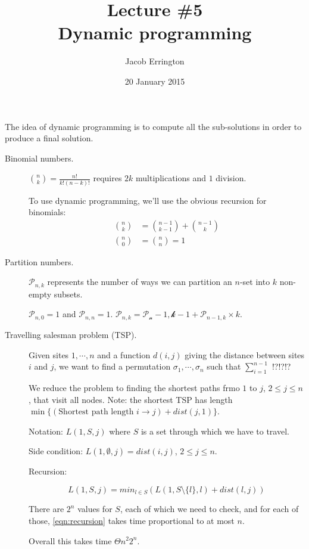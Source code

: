 \documentclass{article}
\author{Jacob Errington}
\title{Lecture \#5 \\ Dynamic programming}
\date{20 January 2015}
\begin{document}
The idea of dynamic programming is to compute all the sub-solutions in order to produce a final solution.

\begin{description}
    \item[Binomial numbers.] $\binom{n}{k} = \frac{n!}{k!(n-k)!}$ requires $2k$ multiplications and $1$ division.

        To use dynamic programming, we'll use the obvious recursion for binomials:
        \begin{align*}
            \binom{n}{k} &= \binom{n-1}{k-1} + \binom{n-1}{k} \\
            \binom{n}{0} &= \binom{n}{n} = 1
        \end{align*}

    \item[Partition numbers.] $\mathcal{P}_{n,k}$ represents the number of ways we can partition an $n$-set into $k$ non-empty subsets.

        $\mathcal{P}_{n,0} = 1$ and $\mathcal{P}_{n,n} = 1$. $\mathcal{P}_{n,k} = \mathcal{P_n-1,k-1} + \mathcal{P}_{n-1,k} \times k$.

    \item[Travelling salesman problem (TSP).]
        Given sites $1,\cdots,n$ and a function $d(i,j)$ giving the distance between sites $i$ and $j$, we want to find a permutation $\sigma_1, \cdots, \sigma_n$ such that $\sum_{i=1}^{n-1}$ !?!?!?

        We reduce the problem to finding the shortest paths frmo $1$ to $j$, $2 \leq j \leq n$, that visit all nodes. Note: the shortest TSP has length $\min\{(\text{Shortest path length } i\to j) + dist(j, 1)\}$.

        Notation: $L(1, S, j)$ where $S$ is a set through which we have to travel.

        Side condition: $L(1, \emptyset, j) = dist(i, j)$, $2 \leq j \leq n$.

        Recursion:

        \begin{equation}
            L(1, S, j) = min_{l\in S}(L(1, S\setminus \{l\}, l) + dist(l, j))
            \label{eqn:recursion}
        \end{equation}

        There are $2^n$ values for $S$, each of which we need to check, and for each of those, \eqref{eqn:recursion} takes time proportional to at most $n$.

        Overall this takes time $\Theta{n^2 2^n}$.


\end{description}
\end{document}
